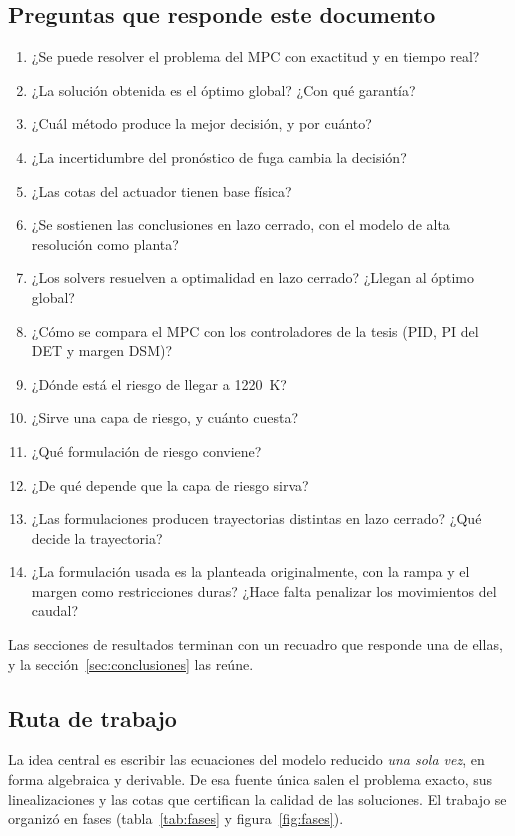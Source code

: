 \subsection{Preguntas que responde este documento}
\begin{enumerate}[label=\textbf{Q\arabic*.}]
  \item ¿Se puede resolver el problema del MPC con exactitud y en tiempo real?
  \item ¿La solución obtenida es el óptimo global? ¿Con qué garantía?
  \item ¿Cuál método produce la mejor decisión, y por cuánto?
  \item ¿La incertidumbre del pronóstico de fuga cambia la decisión?
  \item ¿Las cotas del actuador tienen base física?
  \item ¿Se sostienen las conclusiones en lazo cerrado, con el modelo de alta resolución como
        planta?
  \item ¿Los solvers resuelven a optimalidad en lazo cerrado? ¿Llegan al óptimo global?
  \item ¿Cómo se compara el MPC con los controladores de la tesis (PID, PI del DET y margen
        DSM)?
  \item ¿Dónde está el riesgo de llegar a 1220~K?
  \item ¿Sirve una capa de riesgo, y cuánto cuesta?
  \item ¿Qué formulación de riesgo conviene?
  \item ¿De qué depende que la capa de riesgo sirva?
  \item ¿Las formulaciones producen trayectorias distintas en lazo cerrado? ¿Qué decide la
        trayectoria?
  \item ¿La formulación usada es la planteada originalmente, con la rampa y el margen como
        restricciones duras? ¿Hace falta penalizar los movimientos del caudal?
\end{enumerate}
Las secciones de resultados terminan con un recuadro que responde una de ellas, y la
sección~\ref{sec:conclusiones} las reúne.

\subsection{Ruta de trabajo}
La idea central es escribir las ecuaciones del modelo reducido \emph{una sola vez}, en
forma algebraica y derivable. De esa fuente única salen el problema exacto, sus
linealizaciones y las cotas que certifican la calidad de las soluciones. El trabajo se
organizó en fases (tabla~\ref{tab:fases} y figura~\ref{fig:fases}).

